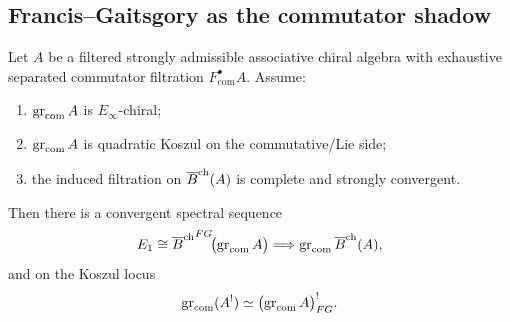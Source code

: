 \subsection{Francis--Gaitsgory as the commutator shadow}

\begin{theorem}
\label{thm:FG-shadow-core}
Let $A$ be a filtered strongly admissible associative chiral algebra with exhaustive separated
commutator filtration $F_{\mathrm{com}}^\bullet A$. Assume:
\begin{enumerate}[label=(\alph*)]
\item $\operatorname{gr}_{\mathrm{com}}A$ is $E_\infty$-chiral;
\item $\operatorname{gr}_{\mathrm{com}}A$ is quadratic Koszul on the commutative/Lie side;
\item the induced filtration on $\overline{B}^{\mathrm{ch}}(A)$ is complete and strongly convergent.
\end{enumerate}
Then there is a convergent spectral sequence
\[
E_1\cong {\overline{B}^{\mathrm{ch}}}^{FG}\!\bigl(\operatorname{gr}_{\mathrm{com}}A\bigr)
\Longrightarrow
\operatorname{gr}_{\mathrm{com}}\overline{B}^{\mathrm{ch}}(A),
\]
and on the Koszul locus
\[
\operatorname{gr}_{\mathrm{com}}(A^!)\simeq \bigl(\operatorname{gr}_{\mathrm{com}}A\bigr)^!_{FG}.
\]
\end{theorem}

